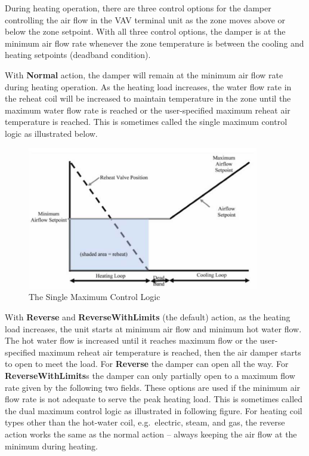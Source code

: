 During heating operation, there are three control options for the damper controlling the air flow in the VAV terminal unit as the zone moves above or below the zone setpoint. With all three control options, the damper is at the minimum air flow rate whenever the zone temperature is between the cooling and heating setpoints (deadband condition).

With \textbf{Normal} action, the damper will remain at the minimum air flow rate during heating operation. As the heating load increases, the water flow rate in the reheat coil will be increased to maintain temperature in the zone until the maximum water flow rate is reached or the user-specified maximum reheat air temperature is reached. This is sometimes called the single maximum control logic as illustrated below.

\begin{figure}[hbtp] %
\centering
\includegraphics[width=0.9\textwidth, height=0.9\textheight, keepaspectratio=true]{media/image264.png}
\caption{The Single Maximum Control Logic \protect \label{fig:the-single-maximum-control-logic}}
\end{figure}

With \textbf{Reverse} and \textbf{ReverseWithLimits} (the default) action, as the heating load increases, the unit starts at minimum air flow and minimum hot water flow. The hot water flow is increased until it reaches maximum flow or the user-specified maximum reheat air temperature is reached, then the air damper starts to open to meet the load. For \textbf{Reverse} the damper can open all the way. For \textbf{ReverseWithLimits}s the damper can only partially open to a maximum flow rate given by the following two fields. These options are used if the minimum air flow rate is not adequate to serve the peak heating load. This is sometimes called the dual maximum control logic as illustrated in following figure. For heating coil types other than the hot-water coil, e.g.~electric, steam, and gas, the reverse action works the same as the normal action -- always keeping the air flow at the minimum during heating.

